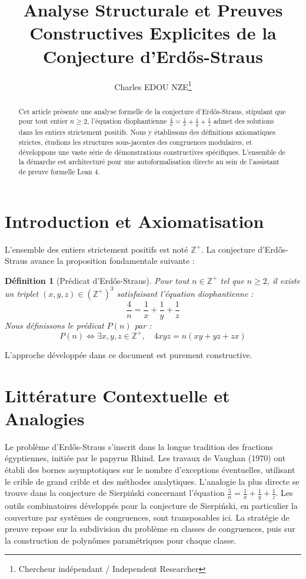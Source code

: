 \documentclass[11pt,a4paper]{article}
\title{Analyse Structurale et Preuves Constructives Explicites de la Conjecture d'Erd\H{o}s-Straus}
\author{Charles EDOU NZE\thanks{Chercheur indépendant / Independent Researcher}}
\date{}
\newtheorem{definition}[theorem]{Définition}
\begin{document}
\maketitle

\begin{abstract}
Cet article présente une analyse formelle de la conjecture d'Erd\H{o}s-Straus, stipulant que pour tout entier $n \geq 2$, l'équation diophantienne $\frac{4}{n} = \frac{1}{x} + \frac{1}{y} + \frac{1}{z}$ admet des solutions dans les entiers strictement positifs. Nous y établissons des définitions axiomatiques strictes, étudions les structures sous-jacentes des congruences modulaires, et développons une vaste série de démonstrations constructives spécifiques. L'ensemble de la démarche est architecturé pour une autoformalisation directe au sein de l'assistant de preuve formelle Lean 4.
\end{abstract}

\tableofcontents

\section{Introduction et Axiomatisation}

L'ensemble des entiers strictement positifs est noté $\mathbb{Z}^{+}$. La conjecture d'Erd\H{o}s-Straus avance la proposition fondamentale suivante :

\begin{definition}[Prédicat d'Erd\H{o}s-Straus]
Pour tout $n \in \mathbb{Z}^{+}$ tel que $n \geq 2$, il existe un triplet $(x, y, z) \in (\mathbb{Z}^{+})^3$ satisfaisant l'équation diophantienne :
\begin{equation}
\frac{4}{n} = \frac{1}{x} + \frac{1}{y} + \frac{1}{z}
\label{eq:erdos}
\end{equation}
Nous définissons le prédicat $P(n)$ par :
$$ P(n) \iff \exists x, y, z \in \mathbb{Z}^{+}, \quad 4xyz = n(xy + yz + zx) $$
\end{definition}

L'approche développée dans ce document est purement constructive.

\section{Littérature Contextuelle et Analogies}

Le problème d'Erd\H{o}s-Straus s'inscrit dans la longue tradition des fractions égyptiennes, initiée par le papyrus Rhind. Les travaux de Vaughan (1970) ont établi des bornes asymptotiques sur le nombre d'exceptions éventuelles, utilisant le crible de grand crible et des méthodes analytiques. L'analogie la plus directe se trouve dans la conjecture de Sierpi\'{n}ski concernant l'équation $\frac{5}{n} = \frac{1}{x} + \frac{1}{y} + \frac{1}{z}$. Les outils combinatoires développés pour la conjecture de Sierpi\'{n}ski, en particulier la couverture par systèmes de congruences, sont transposables ici. La stratégie de preuve repose sur la subdivision du problème en classes de congruences, puis sur la construction de polynômes paramétriques pour chaque classe.
\end{document}

